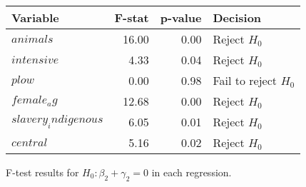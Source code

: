 \centering
\begin{tabular}{lrrl}
\hline
Variable & F-stat & p-value & Decision \\
\hline
$animals$ & 16.00 & 0.00 & Reject $H_0$ \\
$intensive$ & 4.33 & 0.04 & Reject $H_0$ \\
$plow$ & 0.00 & 0.98 & Fail to reject $H_0$ \\
$female_ag$ & 12.68 & 0.00 & Reject $H_0$ \\
$slavery_indigenous$ & 6.05 & 0.01 & Reject $H_0$ \\
$central$ & 5.16 & 0.02 & Reject $H_0$ \\
\hline
\end{tabular}
\caption{F-test results for $H_0: \beta_2 + \gamma_2 = 0$ in each regression.}
\label{tab:Ftest_results}

